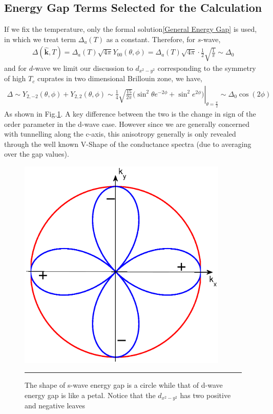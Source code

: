 \subsection{Energy Gap Terms Selected for the Calculation}
If we fix the temperature, only the formal solution\eqref{General Energy Gap} is used, in which we treat term $\Delta_a(T)$ as a constant. Therefore, for $s$-wave, 
\begin{eqnarray}
\Delta(\widehat{\mathbf{k}},T)=\Delta_a(T)\sqrt{4\pi}Y_{00}(\theta,\phi)=\Delta_a(T)\sqrt{4\pi}\cdot\frac{1}{2}\sqrt{\frac{1}{\pi}}\sim \Delta_0
\end{eqnarray}
and for $d$-wave we limit our discussion to $d_{x^2-y^2}$ corresponding to the symmetry of high $T_c$ cuprates in two dimensional Brillouin zone, we have,
\begin{eqnarray}
\left. \Delta\sim Y_{2,-2}(\theta,\phi)+Y_{2,2}(\theta,\phi)\sim\frac{1}{4}\sqrt{\frac{15}{2\pi}}\Big(\sin^2\theta e^{-2\phi}+\sin^2e^{2\phi}\Big)\right|_{\theta=\frac{\pi}{2}}
\sim\Delta_0\cos(2\phi)
\end{eqnarray}
As shown in Fig.\ref{Pair Potential Fig}. A key difference between the two is the change in sign of the order parameter in the d-wave case. However since we are generally concerned with tunnelling along the c-axis, this anisotropy generally is only revealed through the well known V-Shape of the conductance spectra (due to averaging over the gap values).
\begin{figure}[htbp]
\small
\centering
\includegraphics[width=10cm]{./Figures/2-1-1.eps}
\rule{35em}{0.5pt}
\caption[An Electron]{The shape of s-wave energy gap is a circle while that of d-wave energy gap is like a petal. Notice that the $d_{x^2-y^2}$ has two positive and negative leaves}
\label{Pair Potential Fig}
\end{figure}

